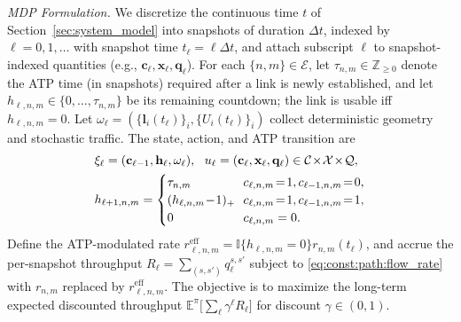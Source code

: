 \documentclass[journal]{IEEEtran}
\begin{document}
\noindent\textit{MDP Formulation.} We discretize the continuous time $t$ of Section~\ref{sec:system_model} into snapshots of duration $\Delta t$, indexed by $\ell=0,1,\dots$ with snapshot time $t_\ell=\ell\Delta t$, and attach subscript $\ell$ to snapshot-indexed quantities (e.g., $\mathbf{c}_\ell,\mathbf{x}_\ell,\mathbf{q}_\ell$). For each $\{n,m\}\in\mathcal{E}$, let $\tau_{n,m}\in\mathbb{Z}_{\geq 0}$ denote the ATP time (in snapshots) required after a link is newly established, and let $h_{\ell,n,m}\in\{0,\dots,\tau_{n,m}\}$ be its remaining countdown; the link is usable iff $h_{\ell,n,m}=0$. Let $\omega_\ell=(\{\mathbf{l}_i(t_\ell)\}_i,\{U_i(t_\ell)\}_i)$ collect deterministic geometry and stochastic traffic. The state, action, and ATP transition are
\begin{equation}
\begin{aligned}
&\xi_\ell = (\mathbf{c}_{\ell-1},\mathbf{h}_\ell,\omega_\ell),\ \ u_\ell=(\mathbf{c}_\ell,\mathbf{x}_\ell,\mathbf{q}_\ell)\in\mathcal{C}\!\times\!\mathcal{X}\!\times\!\mathcal{Q},\\
&h_{\ell+1,n,m}=\begin{cases}\tau_{n,m}&\!\!c_{\ell,n,m}\!=\!1,c_{\ell-1,n,m}\!=\!0,\\ (h_{\ell,n,m}\!-\!1)_{+}&\!\!c_{\ell,n,m}\!=\!1,c_{\ell-1,n,m}\!=\!1,\\ 0&\!\!c_{\ell,n,m}=0.\end{cases}
\end{aligned}\notag
\end{equation}
Define the ATP-modulated rate $r^{\text{eff}}_{\ell,n,m}=\mathbb{I}\{h_{\ell,n,m}=0\}r_{n,m}(t_\ell)$, and accrue the per-snapshot throughput $R_\ell=\sum_{(s,s')}q^{s,s'}_\ell$ subject to \eqref{eq:const:path:flow_rate} with $r_{n,m}$ replaced by $r^{\text{eff}}_{\ell,n,m}$. The objective is to maximize the long-term expected discounted throughput $\mathbb{E}^{\pi}\big[\sum_{\ell}\gamma^\ell R_\ell\big]$ for discount $\gamma\in(0,1)$.
\end{document}
